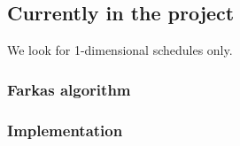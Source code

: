 		\subsection{Currently in the project}

	We look for 1-dimensional schedules only.

			\subsubsection{Farkas algorithm}



			\subsubsection{Implementation}

